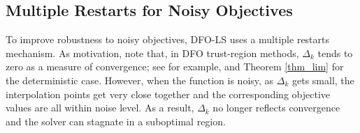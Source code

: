\subsection{Multiple Restarts for Noisy Objectives} \label{sec_restarts_description}
To improve robustness to noisy objectives, DFO-LS uses a multiple restarts mechanism.
As motivation, note that, in  DFO trust-region methods, $\Delta_k$ tends to zero as a measure of convergence; see for example, \cite[Lemma 3.11]{Cartis2017a} and Theorem \ref{thm_lim} for the deterministic case. However, when the function is noisy, as $\Delta_k$ gets small, 
the interpolation points get very close together and the corresponding objective values are all within noise level.
As a result, $\Delta_k$ no longer reflects convergence and the solver can stagnate in a suboptimal region.

